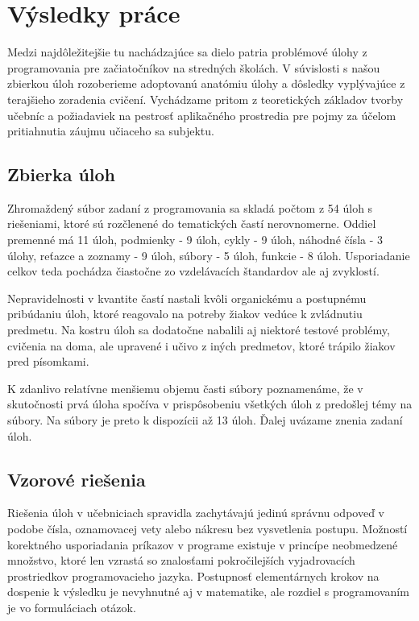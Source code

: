 \chapter{Výsledky práce}
Medzi najdôležitejšie tu nachádzajúce sa dielo patria problémové úlohy z programovania pre začiatočníkov na stredných školách. V súvislosti s našou zbierkou úloh rozoberieme adoptovanú anatómiu úlohy a dôsledky vyplývajúce z terajšieho zoradenia cvičení. Vychádzame pritom z teoretických základov tvorby učebníc a požiadaviek na pestrosť aplikačného prostredia pre pojmy za účelom pritiahnutia záujmu učiaceho sa subjektu.

\section{Zbierka úloh}
Zhromaždený súbor zadaní z programovania sa skladá počtom z 54 úloh s riešeniami, ktoré sú rozčlenené do tematických častí nerovnomerne. Oddiel premenné má 11 úloh, podmienky - 9 úloh, cykly - 9 úloh, náhodné čísla - 3 úlohy, reťazce a zoznamy - 9 úloh, súbory - 5 úloh, funkcie - 8 úloh. Usporiadanie celkov teda pochádza čiastočne zo vzdelávacích štandardov ale aj zvyklostí.

Nepravidelnosti v kvantite častí nastali kvôli organickému a postupnému pribúdaniu úloh, ktoré reagovalo na potreby žiakov vedúce k zvládnutiu predmetu. Na kostru úloh sa dodatočne nabalili aj niektoré testové problémy, cvičenia na doma, ale upravené i učivo z iných predmetov, ktoré trápilo žiakov pred písomkami.

K zdanlivo relatívne menšiemu objemu časti súbory poznamenáme, že v skutočnosti prvá úloha spočíva v prispôsobeniu všetkých úloh z predošlej témy na súbory. Na súbory je preto k dispozícii až 13 úloh. Ďalej uvázame znenia zadaní úloh.









\section{Vzorové riešenia}
Riešenia úloh v učebniciach spravidla zachytávajú jedinú správnu odpoveď v podobe čísla, oznamovacej vety alebo nákresu bez vysvetlenia postupu. Možností korektného usporiadania príkazov v programe existuje v princípe neobmedzené množstvo, ktoré len vzrastá so znalosťami pokročilejších vyjadrovacích prostriedkov programovacieho jazyka. Postupnosť elementárnych krokov na dospenie k výsledku je nevyhnutné aj v matematike, ale rozdiel s programovaním je vo formuláciach otázok.

